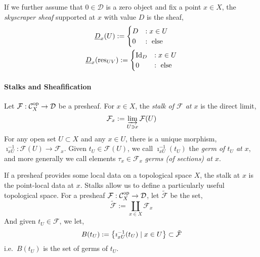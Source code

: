 \documentclass[000-main.tex]{subfiles}
\begin{document}
If we further assume that $0\in\mathcal{D}$ is a zero object and fix a point $x\in X$, the \emph{skyscraper sheaf} supported at $x$ with value $D$ is the sheaf,
\begin{displaymath}
  \begin{gathered}
  \underline{D}_x(U) :=
  \begin{cases}
    D &: x\in U\\
    0 &: \text{ else }
  \end{cases}\\
  \underline{D}_x(\operatorname{res}_{UV}) :=
  \begin{cases}
    \operatorname{Id}_D &: x\in U\\
    0 &: \text{ else }
  \end{cases}
\end{gathered}
\end{displaymath}

\paragraph{Stalks and Sheafification}

\begin{definition}
  Let $\mathcal{F}: \mathcal{C}_X^{\text{op}}\to \mathcal{D}$ be a presheaf.
  For $x\in X$, the \emph{stalk of $\mathcal{F}$ at $x$} is the direct limit,
  \begin{displaymath}
    \mathcal{F}_x := \varinjlim_{U\ni x}\mathcal{F}(U)
  \end{displaymath}
  For any open set $U\subset X$ and any $x\in U$, there is a unique morphism, $\imath_{x U}^{-1}: \mathcal{F}(U) \to \mathcal{F}_x$.
  Given $t_U\in \mathcal{F}(U)$, we call $\imath_{x U}^{-1}(t_U)$ the \emph{germ of $t_U$ at $x$}, and more generally we call elements $\tau_x \in \mathcal{F}_x$ \emph{germs (of sections) at $x$}.
\end{definition}

If a presheaf provides some local data on a topological space $X$, the stalk at $x$ is the point-local data at $x$.
Stalks allow us to define a particularly useful topological space.
For a presheaf $\mathcal{F}: \mathcal{C}_X^{\text{op}}\to \mathcal{D}$, let $\tilde{\mathcal{F}}$ be the set,
\begin{displaymath}
  \tilde{\mathcal{F}} := \coprod_{x\in X}\mathcal{F}_x
\end{displaymath}
And given $t_U\in \mathcal{F}$, we let,
\begin{displaymath}
  B(t_U) := \qty{\imath_{x U}^{-1}(t_U) \mid x\in U} \subset \tilde{\mathcal{F}}
\end{displaymath}
i.e.\ $B(t_U)$ is the set of germs of $t_U$.
\end{document}
